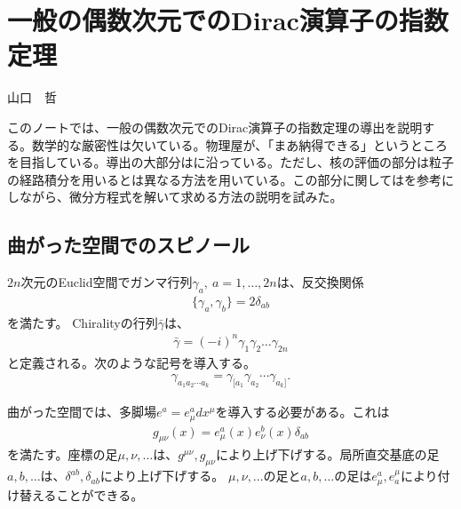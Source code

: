 \documentclass[12pt,a4paper]{jlreq}
\newcommand{\gammab}{\bar{\gamma}}
\begin{document}
\section*{一般の偶数次元でのDirac演算子の指数定理}
\begin{flushright}
  {\large 山口　哲　　　　}  
\end{flushright}

このノートでは、一般の偶数次元でのDirac演算子の指数定理の導出を説明する。数学的な厳密性は欠いている。物理屋が、「まあ納得できる」というところを目指している。導出の大部分は\cite{Fujikawa}に沿っている。ただし、核の評価の部分は粒子の経路積分を用いる\cite{Fujikawa}とは異なる方法を用いている。この部分に関しては\cite{Yoshida}を参考にしながら、微分方程式を解いて求める方法の説明を試みた。
\subsection*{曲がった空間でのスピノール}
$2n$次元のEuclid空間でガンマ行列$\gamma_a,\ a=1,\dots,2n$は、反交換関係
\begin{align*}
  \{ \gamma_a,\gamma_b \} = 2\delta_{ab}
\end{align*}
を満たす。
Chiralityの行列$\gammab$は、
\begin{align*}
  \gammab = (-i)^n \gamma_{1}\gamma_{2}\dots\gamma_{2n}
\end{align*}
と定義される。次のような記号を導入する。
\begin{align*}
  \gamma_{a_1 a_2 \cdots a_k} = \gamma_{[a_1}\gamma_{a_2}\cdots \gamma_{a_k]}.
\end{align*}

曲がった空間では、多脚場$e^{a}=e^{a}_{\mu} dx^{\mu}$を導入する必要がある。これは
\begin{align*}
  g_{\mu\nu}(x)=e^{a}_{\mu}(x)e^{b}_{\nu}(x)\delta_{ab}
\end{align*}
を満たす。座標の足$\mu,\nu,\dots$は、$g^{\mu\nu},g_{\mu\nu}$により上げ下げする。局所直交基底の足$a,b,\dots$は、$\delta^{ab},\delta_{ab}$により上げ下げする。 
$\mu,\nu,\dots$の足と$a,b,\dots$の足は$e_{\mu}^{a},e^{\mu}_{a}$により付け替えることができる。
\end{document}
